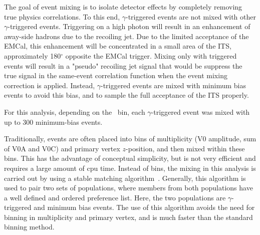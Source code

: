  
 The goal of event mixing is to isolate detector effects by completely removing true physics correlations. To this end, $\gamma$-triggered events are not mixed with other $\gamma$-triggered events. Triggering on a high \pt photon will result in an enhancement of away-side hadrons due to the recoiling jet. Due to the limited acceptance of the EMCal, this enhancement will be concentrated in a small area of the ITS, approximately 180$^{\circ}$ opposite the EMCal trigger. Mixing only with triggered events will result in a "pseudo" recoiling jet signal that would be suppress the true signal in the same-event correlation function when the event mixing correction is applied. Instead, $\gamma$-triggered events are mixed with minimum bias events to avoid this bias, and to sample the full acceptance of the ITS properly.
 
 

 

For this analysis, depending on the \zt~bin, each \(\gamma\)-triggered event was mixed with up to 300 minimum-bias events.

 Traditionally, events are often placed into bins of multiplicity (V0 amplitude, sum of V0A and V0C) and primary vertex $z$-position, and then mixed within these bins. This has the advantage of conceptual simplicity, but is not very efficient and requires a large amount of cpu time. Instead of bins, the mixing in this analysis is carried out by using a stable matching algorithm~\cite{GaleShapley:1962amm}. Generally, this algorithm is used to pair two sets of populations, where members from both populations have a well defined and ordered preference list. Here, the two populations are $\gamma$-triggered and minimum bias events. The use of this algorithm avoids the need for binning in multiplicity and primary vertex, and is much faster than the standard binning method.
 
